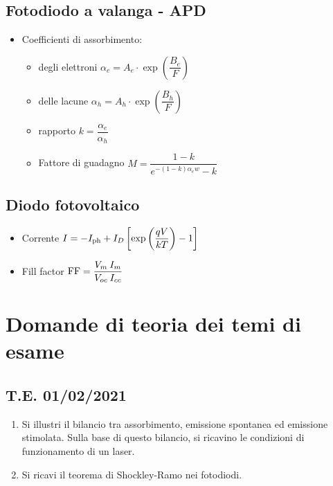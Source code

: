 \documentclass[9pt]{extarticle}
\begin{document}
\subsection{Fotodiodo a valanga - APD}
\begin{itemize}
  \item Coefficienti di assorbimento:
        \begin{itemize}
          \item degli elettroni \( \alpha_e = A_e \cdot \exp\left(\dfrac{B_e}{F}\right) \)
          \item delle lacune \( \alpha_h = A_h \cdot \exp\left(\dfrac{B_h}{F}\right) \)
          \item rapporto \( k = \dfrac{\alpha_e}{\alpha_h} \)
          \item Fattore di guadagno \( M = \dfrac{1 - k}{e^{-(1-k) \alpha_e w} - k } \)
        \end{itemize}
\end{itemize}

\subsection{Diodo fotovoltaico}
\begin{itemize}
  \item Corrente \( I = - I_{\textnormal{ph}} + I_D \left[\exp\left(\dfrac{qV}{kT}\right) - 1 \right] \)
  \item Fill factor \( \textnormal{FF} = \dfrac{V_m \: I_m}{V_{oc} \: I_{cc}} \)
\end{itemize}

\newpage

\section{Domande di teoria dei temi di esame}

\subsection{T.E. 01/02/2021}
\begin{enumerate}
  \item Si illustri il bilancio tra assorbimento, emissione spontanea ed emissione stimolata. Sulla base di questo bilancio,
        si ricavino le condizioni di funzionamento di un laser.
  \item Si ricavi il teorema di Shockley-Ramo nei fotodiodi.
\end{enumerate}
\end{document}
